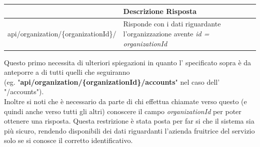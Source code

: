 	\begin{small}
		\begin{longtable}{ | l | p{8cm} | }
			\hline \textbf{\glo{URL}} & \textbf{Descrizione Risposta}\\
			\hline api/organization/\{organizationId\}/ & Risponde con i dati riguardante l'organizzazione avente \textit{id = organizationId}\\
			\hline
		\end{longtable}		
	\end{small}
Questo primo  necessita di ulteriori spiegazioni in quanto l' specificato sopra è da anteporre a di tutti quelli che seguiranno \\(eg. "\textbf{api/organization/\{organizationId\}/accounts}" nel caso dell' "/accounts").\\
Inoltre si noti che è necessario da parte di chi effettua chiamate verso questo  (e quindi anche verso tutti gli altri) conoscere il campo \textit{organizationId} per poter ottenere una risposta. Questa restrizione è stata posta per far si che il sistema sia più sicuro, rendendo disponibili dei dati riguardanti l'azienda fruitrice del servizio solo se si conosce il corretto identificativo.
\newpage
\begingroup\onehalfspacing
